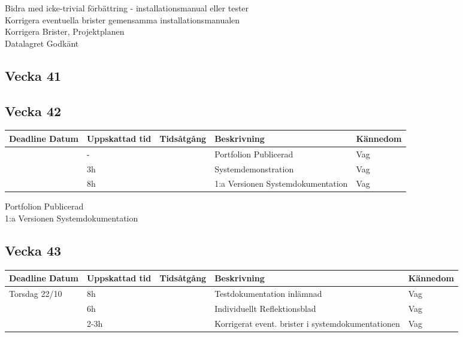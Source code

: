 \documentclass{TDP003mall}
\begin{document}
\begin{itemize}
Bidra med icke-trivial förbättring - installationsmanual eller tester\\
Korrigera eventuella brister gemensamma installationsmanualen\\
Korrigera Brister, Projektplanen\\
Datalagret Godkänt\\

\subsection{Vecka 41}


\subsection{Vecka 42}
\begin{tabularx}{\linewidth}{|l|l|l|X|l|}
	\hline
	Deadline Datum & Uppskattad tid & Tidsåtgång & Beskrivning                       & Kännedom \\ [0.5ex]
	\hline
                   & -              &            & Portfolion Publicerad             & Vag      \\
	\hline
                   & 3h             &            & Systemdemonstration               & Vag      \\
	\hline
                   & 8h             &            & 1:a Versionen Systemdokumentation & Vag      \\
	\hline
\end{tabularx}{\linewidth}

Portfolion Publicerad\\
1:a Versionen Systemdokumentation\\

\subsection{Vecka 43}
\begin{tabularx}{\linewidth}{|l|l|l|X|l|}
	\hline
	Deadline Datum & Uppskattad tid & Tidsåtgång & Beskrivning                                       & Kännedom \\ [0.5ex]
	\hline
	Torsdag 22/10  & 8h             &            & Testdokumentation inlämnad                        & Vag      \\
	\hline
                   & 6h             &            & Individuellt Reflektionsblad                      & Vag      \\
	\hline
                   & 2-3h           &            & Korrigerat event. brister i systemdokumentationen & Vag      \\
	\hline
\end{tabularx}{\linewidth}


\end{itemize}
\end{document}
